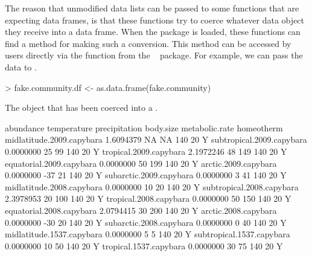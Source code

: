 \documentclass[a4paper]{report}
\begin{document}
\begin{article}
The reason that unmodified data lists can be passed to some functions that are expecting data frames, is that these functions try to coerce whatever data object they receive into a data frame.  When the  package is loaded, these functions can find a method for making such a conversion.  This method can be accessed by users directly via the  function from the \R\  package.  For example, we can pass the  data to .
\begin{Schunk}
\begin{Sinput}
> fake.community.df <- as.data.frame(fake.community)
\end{Sinput}
\end{Schunk}
\begin{table*}
\caption{The   object that has been coerced into a .}
\label{tab:dataframe}
\begin{Schunk}
\begin{Soutput}
                          abundance temperature precipitation body.size metabolic.rate homeotherm
midlatitude.2009.capybara 1.6094379          NA            NA       140             20          Y
subtropical.2009.capybara 0.0000000          25            99       140             20          Y
tropical.2009.capybara    2.1972246          48           149       140             20          Y
equatorial.2009.capybara  0.0000000          50           199       140             20          Y
arctic.2009.capybara      0.0000000         -37            21       140             20          Y
subarctic.2009.capybara   0.0000000           3            41       140             20          Y
midlatitude.2008.capybara 0.0000000          10            20       140             20          Y
subtropical.2008.capybara 2.3978953          20           100       140             20          Y
tropical.2008.capybara    0.0000000          50           150       140             20          Y
equatorial.2008.capybara  2.0794415          30           200       140             20          Y
arctic.2008.capybara      0.0000000         -30            20       140             20          Y
subarctic.2008.capybara   0.0000000           0            40       140             20          Y
midlatitude.1537.capybara 0.0000000           5             5       140             20          Y
subtropical.1537.capybara 0.0000000          10            50       140             20          Y
tropical.1537.capybara    0.0000000          30            75       140             20          Y

\end{Soutput}
\end{Schunk}
\end{table*}
\end{article}
\end{document}
